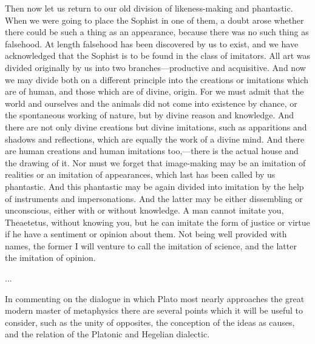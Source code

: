 \documentclass[11pt,letter]{article}
\begin{document}
\par  Then now let us return to our old division of likeness-making and phantastic. When we were going to place the Sophist in one of them, a doubt arose whether there could be such a thing as an appearance, because there was no such thing as falsehood. At length falsehood has been discovered by us to exist, and we have acknowledged that the Sophist is to be found in the class of imitators. All art was divided originally by us into two branches—productive and acquisitive. And now we may divide both on a different principle into the creations or imitations which are of human, and those which are of divine, origin. For we must admit that the world and ourselves and the animals did not come into existence by chance, or the spontaneous working of nature, but by divine reason and knowledge. And there are not only divine creations but divine imitations, such as apparitions and shadows and reflections, which are equally the work of a divine mind. And there are human creations and human imitations too,—there is the actual house and the drawing of it. Nor must we forget that image-making may be an imitation of realities or an imitation of appearances, which last has been called by us phantastic. And this phantastic may be again divided into imitation by the help of instruments and impersonations. And the latter may be either dissembling or unconscious, either with or without knowledge. A man cannot imitate you, Theaetetus, without knowing you, but he can imitate the form of justice or virtue if he have a sentiment or opinion about them. Not being well provided with names, the former I will venture to call the imitation of science, and the latter the imitation of opinion.
 
\par  ...

\par  In commenting on the dialogue in which Plato most nearly approaches the great modern master of metaphysics there are several points which it will be useful to consider, such as the unity of opposites, the conception of the ideas as causes, and the relation of the Platonic and Hegelian dialectic.
\end{document}
